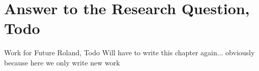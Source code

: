 \section{Answer to the Research Question, Todo}
Work for Future Roland, Todo
Will have to write this chapter again... obviously because here we only write new work

